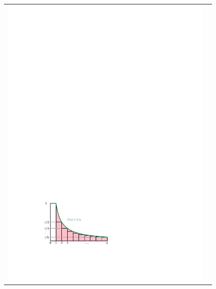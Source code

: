\begin{figure}
  \begin{center}
    \begin{tabular}{cc}
      \includegraphics[width=\HalfScaleIfNeeded]{figs/harmonic-2} 

\end{tabular}
\end{center}
\end{figure}
